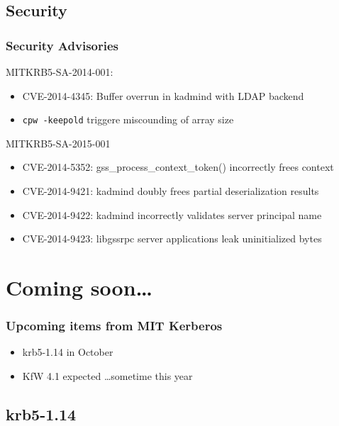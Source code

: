 \documentclass{beamer}
\begin{document}
\subsection{Security}

\begin{frame}[fragile]
\frametitle{Security Advisories}
MITKRB5-SA-2014-001:
\begin{itemize}
\item{CVE-2014-4345: Buffer overrun in kadmind with LDAP backend}
\item{\verb+cpw -keepold+ triggere miscounding of array size}
\end{itemize}
MITKRB5-SA-2015-001
\begin{itemize}
\item{CVE-2014-5352: gss\_process\_context\_token() incorrectly frees context}
\item{CVE-2014-9421: kadmind doubly frees partial deserialization results}
\item{CVE-2014-9422: kadmind incorrectly validates server principal name}
\item{CVE-2014-9423: libgssrpc server applications leak uninitialized bytes}
\end{itemize}
\end{frame}

\section{Coming soon\ldots{}}

\begin{frame}
\frametitle{Upcoming items from MIT Kerberos}
\begin{itemize}
\item{krb5-1.14 in October}
\item{KfW 4.1 expected \ldots sometime this year}
\end{itemize}
\end{frame}

\subsection{krb5-1.14}
\end{document}
